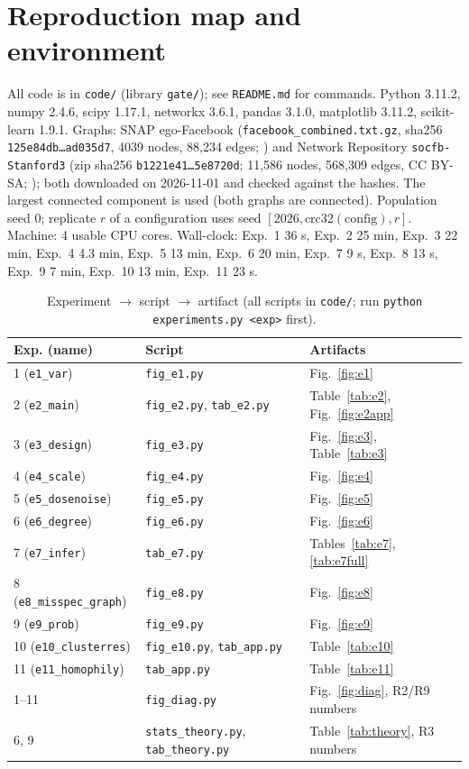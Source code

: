 \section{Reproduction map and environment}\label{app:repro}
All code is in \texttt{code/} (library \texttt{gate/}); see \texttt{README.md} for commands. Python 3.11.2, numpy 2.4.6, scipy 1.17.1, networkx 3.6.1, pandas 3.1.0, matplotlib 3.11.2, scikit-learn 1.9.1. Graphs: SNAP ego-Facebook (\texttt{facebook\_combined.txt.gz}, sha256 \texttt{125e84db\ldots ad035d7}, 4039 nodes, 88{,}234 edges; \citealt{mcauley2012}) and Network Repository \texttt{socfb-Stanford3} (zip sha256 \texttt{b1221e41\ldots 5e8720d}; 11{,}586 nodes, 568{,}309 edges, CC BY-SA; \citealt{rossi2015,traud2012}); both downloaded on 2026-11-01 and checked against the hashes. The largest connected component is used (both graphs are connected). Population seed $0$; replicate $r$ of a configuration uses seed $[2026,\mathrm{crc32}(\mathrm{config}),r]$. Machine: 4 usable CPU cores. Wall-clock: Exp.~1 36 s, Exp.~2 25 min, Exp.~3 22 min, Exp.~4 4.3 min, Exp.~5 13 min, Exp.~6 20 min, Exp.~7 9 s, Exp.~8 13 s, Exp.~9 7 min, Exp.~10 13 min, Exp.~11 23 s.

\begin{table}[h]
\caption{Experiment $\to$ script $\to$ artifact (all scripts in \texttt{code/}; run \texttt{python experiments.py <exp>} first).}\label{tab:repro}
\centering\scriptsize
\setlength{\tabcolsep}{2pt}
\begin{tabular}{lll}
\toprule
Exp. (name) & Script & Artifacts\\
\midrule
1 (\texttt{e1\_var}) & \texttt{fig\_e1.py} & Fig.~\ref{fig:e1}\\
2 (\texttt{e2\_main}) & \texttt{fig\_e2.py}, \texttt{tab\_e2.py} & Table~\ref{tab:e2}, Fig.~\ref{fig:e2app}\\
3 (\texttt{e3\_design}) & \texttt{fig\_e3.py} & Fig.~\ref{fig:e3}, Table~\ref{tab:e3}\\
4 (\texttt{e4\_scale}) & \texttt{fig\_e4.py} & Fig.~\ref{fig:e4}\\
5 (\texttt{e5\_dosenoise}) & \texttt{fig\_e5.py} & Fig.~\ref{fig:e5}\\
6 (\texttt{e6\_degree}) & \texttt{fig\_e6.py} & Fig.~\ref{fig:e6}\\
7 (\texttt{e7\_infer}) & \texttt{tab\_e7.py} & Tables~\ref{tab:e7}, \ref{tab:e7full}\\
8 (\texttt{e8\_misspec\_graph}) & \texttt{fig\_e8.py} & Fig.~\ref{fig:e8}\\
9 (\texttt{e9\_prob}) & \texttt{fig\_e9.py} & Fig.~\ref{fig:e9}\\
10 (\texttt{e10\_clusterres}) & \texttt{fig\_e10.py}, \texttt{tab\_app.py} & Table~\ref{tab:e10}\\
11 (\texttt{e11\_homophily}) & \texttt{tab\_app.py} & Table~\ref{tab:e11}\\
1--11 & \texttt{fig\_diag.py} & Fig.~\ref{fig:diag}, R2/R9 numbers\\
6, 9 & \texttt{stats\_theory.py}, \texttt{tab\_theory.py} & Table~\ref{tab:theory}, R3 numbers\\
\bottomrule
\end{tabular}
\end{table}

